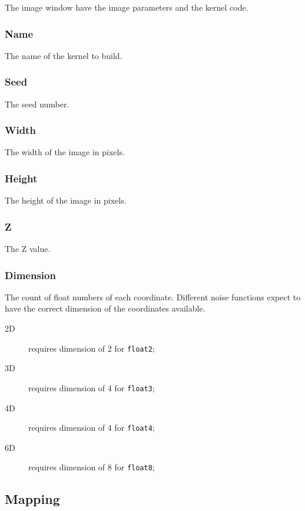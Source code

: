 The image window have the image parameters and the kernel code.

\subsubsection{Name}

The name of the kernel to build.

\subsubsection{Seed}

The seed number.

\subsubsection{Width}

The width of the image in pixels.

\subsubsection{Height}

The height of the image in pixels.

\subsubsection{Z}

The Z value.

\subsubsection{Dimension}

The count of float numbers of each coordinate. Different noise functions
expect to have the correct dimension of the coordinates available.

\begin{description}
\item[2D] requires dimension of 2 for \texttt{float2};
\item[3D] requires dimension of 4 for \texttt{float3};
\item[4D] requires dimension of 4 for \texttt{float4};
\item[6D] requires dimension of 8 for \texttt{float8};
\end{description}

\subsection{Mapping}

